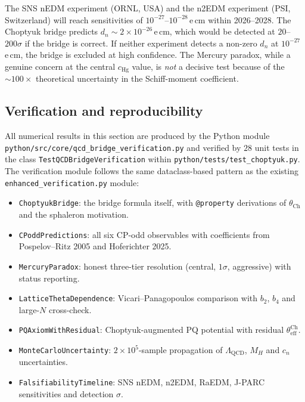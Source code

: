 \begin{keyfind}
The SNS nEDM experiment (ORNL, USA) and the n2EDM experiment (PSI,
Switzerland) will reach sensitivities of $10^{-27}$--$10^{-28}\,$e\,cm
within 2026--2028.  The Choptyuk bridge predicts $d_n\sim 2\times 10^{-26}\,$e\,cm,
which would be detected at $20$--$200\sigma$ if the bridge is correct.
If neither experiment detects a non-zero $d_n$ at $10^{-27}\,$e\,cm,
the bridge is excluded at high confidence.  The Mercury paradox,
while a genuine concern at the central $c_{\mathrm{Hg}}$ value, is
\emph{not} a decisive test because of the $\sim 100\times$ theoretical
uncertainty in the Schiff-moment coefficient.
\end{keyfind}

\subsection{Verification and reproducibility}
\label{ssec:verification-reproducibility}

All numerical results in this section are produced by the Python module
\texttt{python/src/core/qcd\_bridge\_verification.py} and verified by
$28$ unit tests in the class
\texttt{TestQCDBridgeVerification} within
\texttt{python/tests/test\_choptyuk.py}.  The verification module
follows the same dataclass-based pattern as the existing
\texttt{enhanced\_verification.py} module:

\begin{itemize}[leftmargin=2em,itemsep=0.1em]
  \item \texttt{ChoptyukBridge}: the bridge formula itself, with
        \texttt{@property} derivations of $\theta_{\mathrm{Ch}}$ and
        the sphaleron motivation.
  \item \texttt{CPoddPredictions}: all six CP-odd observables with
        coefficients from Pospelov--Ritz 2005 and Hoferichter 2025.
  \item \texttt{MercuryParadox}: honest three-tier resolution (central,
        $1\sigma$, aggressive) with status reporting.
  \item \texttt{LatticeThetaDependence}: Vicari--Panagopoulos
        comparison with $b_2$, $b_4$ and large-$N$ cross-check.
  \item \texttt{PQAxiomWithResidual}: Choptyuk-augmented PQ potential
        with residual $\theta_{\mathrm{eff}}^{\mathrm{Ch}}$.
  \item \texttt{MonteCarloUncertainty}: $2\times 10^5$-sample
        propagation of $\Lambda_{\mathrm{QCD}}$, $M_H$ and $c_n$
        uncertainties.
  \item \texttt{FalsifiabilityTimeline}: SNS nEDM, n2EDM, RaEDM,
        J-PARC sensitivities and detection $\sigma$.
\end{itemize}

